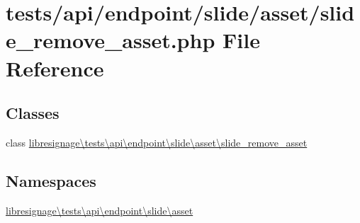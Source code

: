 \hypertarget{tests_2api_2endpoint_2slide_2asset_2slide__remove__asset_8php}{}\section{tests/api/endpoint/slide/asset/slide\+\_\+remove\+\_\+asset.php File Reference}
\label{tests_2api_2endpoint_2slide_2asset_2slide__remove__asset_8php}
\subsection*{Classes}
\begin{DoxyCompactItemize}
\item 
class \hyperlink{classlibresignage_1_1tests_1_1api_1_1endpoint_1_1slide_1_1asset_1_1slide__remove__asset}{libresignage\textbackslash{}tests\textbackslash{}api\textbackslash{}endpoint\textbackslash{}slide\textbackslash{}asset\textbackslash{}slide\+\_\+remove\+\_\+asset}
\end{DoxyCompactItemize}
\subsection*{Namespaces}
\begin{DoxyCompactItemize}
\item 
 \hyperlink{namespacelibresignage_1_1tests_1_1api_1_1endpoint_1_1slide_1_1asset}{libresignage\textbackslash{}tests\textbackslash{}api\textbackslash{}endpoint\textbackslash{}slide\textbackslash{}asset}
\end{DoxyCompactItemize}
